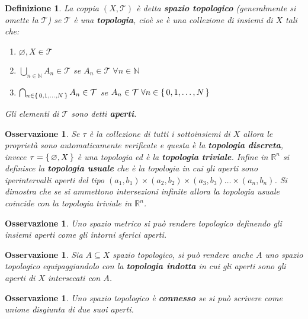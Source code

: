 \documentclass[10pt, twoside=false, x11names]{scrbook}
\newtheorem{osservation}[theorem]{Osservazione}
\newtheorem{definition}[theorem]{Definizione}
\newcommand{\RN}[1][]{\mathbb{R}^#1}
\let\emptyset\varnothing
\begin{document}
\begin{definition}
  La coppia $ (X, \mathcal{T}) $ è detta \textbf{spazio topologico}
  (generalmente si omette la $ \mathcal{T} $)
  se $ \mathcal{T} $ è una \textbf{topologia}, cioè se è una collezione di insiemi di $ X $ tali che:
  \begin{enumerate}
  \item $ \emptyset, X \in \mathcal{T} $
  \item $ \bigcup_{n \in \mathbb{N}} A_n \in \mathcal{T} $ se $ A_n \in \mathcal{T} \; \forall n \in \mathbb{N} $
  \item $ \bigcap_{n \in \set{0,1,\dots,N} } A_n \in \mathcal{T} $ se $ A_n \in \mathcal{T} \; \forall n \in \set{0,1,\dots,N} $
  \end{enumerate}
  Gli elementi di $ \mathcal{T} $ sono detti \textbf{aperti}.
\end{definition}
\begin{osservation}
  Se $ \tau $ è la collezione di tutti i sottoinsiemi di $ X $ allora le proprietà sono automaticamente
  verificate e questa è la \textbf{topologia discreta}, invece
  $ \tau = \set{\emptyset, X} $ è una topologia ed è la \textbf{topologia triviale}.
  Infine in $ \RN{n} $ si definisce la \textbf{topologia usuale} che è la topologia in cui gli aperti
  sono iperintervalli aperti del tipo $ (a_1,b_1) \times (a_2, b_2) \times (a_3, b_3) \dots \times (a_n, b_n) $.
  Si dimostra che se si ammettono intersezioni infinite allora la topologia usuale coincide con la topologia
  triviale in $ \RN{n} $.
\end{osservation}

\begin{osservation}
  Uno spazio metrico si può rendere topologico definendo gli insiemi aperti come gli intorni sferici aperti.
\end{osservation}

\begin{osservation}
  Sia $ A \subseteq X $ spazio topologico, si può rendere anche $ A $ uno spazio topologico equipaggiandolo con la
  \textbf{topologia indotta} in cui gli aperti sono gli aperti di $ X $ intersecati
  con $ A $.
\end{osservation}

\begin{osservation}
  Uno spazio topologico è \textbf{connesso} se si può scrivere come
  unione disgiunta di due suoi aperti.
\end{osservation}
\end{document}
